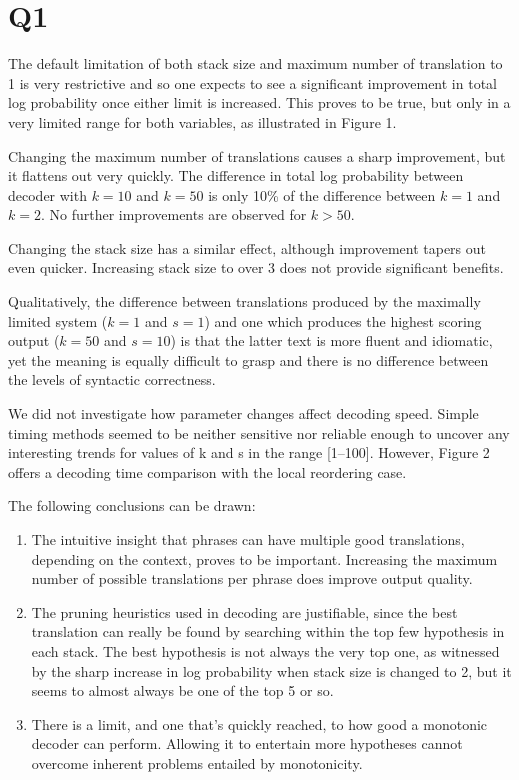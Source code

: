 \section*{Q1}
The default limitation of both stack size and maximum number of translation to 1 is very restrictive and so one expects to see a significant improvement in total log probability once either limit is increased. This proves to be true, but only in a very limited range for both variables, as illustrated in Figure 1.
\vspace{4mm} %

Changing the maximum number of translations causes a sharp improvement, but it flattens out very quickly. The difference in total log probability between decoder with $k=10$ and $k=50$ is only 10\% of the difference between $k=1$ and $k=2$. No further improvements are observed for $k>50$.

Changing the stack size has a similar effect, although improvement tapers out even quicker. Increasing stack size to over 3 does not provide significant benefits.

Qualitatively, the difference between translations produced by the maximally limited system ($k=1$ and $s=1$) and one which produces the highest scoring output ($k=50$ and $s=10$) is that the latter text is more fluent and idiomatic, yet the meaning is equally difficult to grasp and there is no difference between the levels of syntactic correctness.

We did not investigate how parameter changes affect decoding speed. Simple timing methods seemed to be neither sensitive nor reliable enough to uncover any interesting trends for values of k and s in the range [1--100]. However, Figure 2 offers a decoding time comparison with the local reordering case. 
\vspace{4mm} %

The following conclusions can be drawn:
\begin{enumerate}
	\item
	The intuitive insight that phrases can have multiple good translations, depending on the context, proves to be important. Increasing the maximum number of possible translations per phrase does improve output quality.
	\item
	The pruning heuristics used in decoding are justifiable, since the best translation can really be found by searching within the top few hypothesis in each stack. The best hypothesis is not always the very top one, as witnessed by the sharp increase in log probability when stack size is changed to 2, but it seems to almost always be one of the top 5 or so.
	\item
	There is a limit, and one that's quickly reached, to how good a monotonic decoder can perform. Allowing it to entertain more hypotheses cannot overcome inherent problems entailed by monotonicity.
\end{enumerate}

